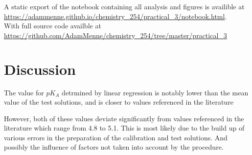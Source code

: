\documentclass[a4paper, british]{article}
\begin{document}
A static export of the notebook containing all analysis and figures is availible at \url{https://adammenne.github.io/chemistry_254/practical_3/notebook.html}.\\ With full source code availble at \url{https://github.com/AdamMenne/chemistry_254/tree/master/practical_3}

\section{Discussion}

The value for \(pK_A\) detrmined by linear regression is notably lower than the mean value of the test solutions, and is closer to values referenced in the literature

However, both of these values deviate significantly from values referenced in the literature which range from 4.8 to 5.1. This is most likely due to the build up of various errors in the preparation of the calibration and test solutions. And possibly the influence of factors not taken into account by the procedure. 

\newpage
\end{document}

